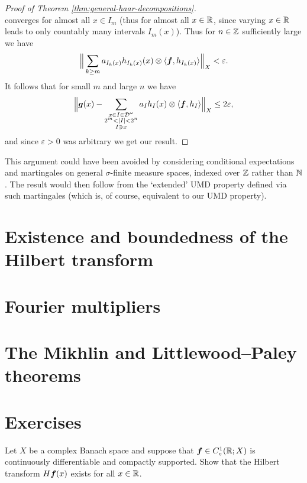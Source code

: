 \begin{proof}[Proof of Theorem \ref{thm:general-haar-decompositions}]
\begin{equation*}
\end{equation*}
converges for almost all $x \in I_{m}$ (thus for almost all $x \in \mathbb{R}$, since varying $x \in \mathbb{R}$ leads to only countably many intervals $I_{m}(x)$).
Thus for $n \in \mathbb{Z}$ sufficiently large we have
\begin{equation*}
  \Big\| \sum_{k \geq m} a_{I_{k}(x)} h_{I_{k}(x)}(x) \otimes \langle \bm{f}, h_{I_{k}(x)} \rangle \Big\|_{X} < \varepsilon.
\end{equation*}
It follows that for small $m$ and large $n$ we have
\begin{equation*}
  \Big\|  \bm{g}(x) - \sum_{\substack{x \in I \in \mathcal{D}^{\omega} \\ 2^{m} < |I| < 2^{n} \\ I \ni x}} a_{I} h_{I}(x) \otimes \langle \bm{f}, h_{I} \rangle  \Big\|_{X} \leq 2\varepsilon,
\end{equation*}
and since $\varepsilon > 0$ was arbitrary we get our result.
\end{proof}

\begin{rmk}
  This argument could have been avoided by considering conditional expectations and martingales on general $\sigma$-finite measure spaces, indexed over $\mathbb{Z}$ rather than $\mathbb{N}$.
  The result would then follow from the `extended' UMD property defined via such martingales (which is, of course, equivalent to our UMD property).
\end{rmk}

\section{Existence and boundedness of the Hilbert transform}

\section{Fourier multipliers}

\section{The Mikhlin and Littlewood--Paley  theorems}

\section{Exercises}

\begin{exercise}\label{ex:HT-C1}
  Let $X$ be a complex Banach space and suppose that $\bm{f} \in C_{c}^1(\mathbb{R};X)$ is continuously differentiable and compactly supported.
  Show that the Hilbert transform $H\bm{f}(x)$ exists for all $x \in \mathbb{R}$.
\end{exercise}

